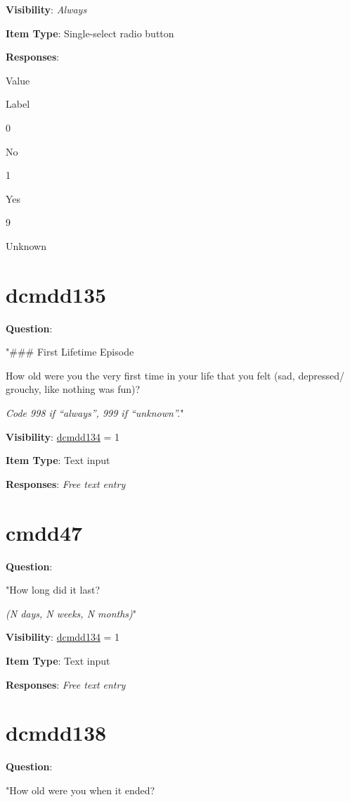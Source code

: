 \documentclass[
]{book}
\begin{document}
\textbf{Visibility}: \emph{Always}

\textbf{Item Type}: Single-select radio button

\textbf{Responses}:

Value

Label

0

No

1

Yes

9

Unknown

\hypertarget{dcmdd135}{%
\section{dcmdd135}\label{dcmdd135}}

\textbf{Question}:

"\#\#\# First Lifetime Episode

How old were you the very first time in your life that you felt (sad, depressed/ grouchy, like nothing was fun)?

\emph{Code 998 if ``always'', 999 if ``unknown''.}"

\textbf{Visibility}: \protect\hyperlink{dcmdd134}{dcmdd134} = 1

\textbf{Item Type}: Text input

\textbf{Responses}: \emph{Free text entry}

\hypertarget{cmdd47}{%
\section{cmdd47}\label{cmdd47}}

\textbf{Question}:

"How long did it last?

\emph{(N days, N weeks, N months)}"

\textbf{Visibility}: \protect\hyperlink{dcmdd134}{dcmdd134} = 1

\textbf{Item Type}: Text input

\textbf{Responses}: \emph{Free text entry}

\hypertarget{dcmdd138}{%
\section{dcmdd138}\label{dcmdd138}}

\textbf{Question}:

"How old were you when it ended?
\end{document}
